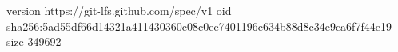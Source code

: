 version https://git-lfs.github.com/spec/v1
oid sha256:5ad55df66d14321a411430360c08c0ee7401196c634b88d8c34e9ca6f7f44e19
size 349692
